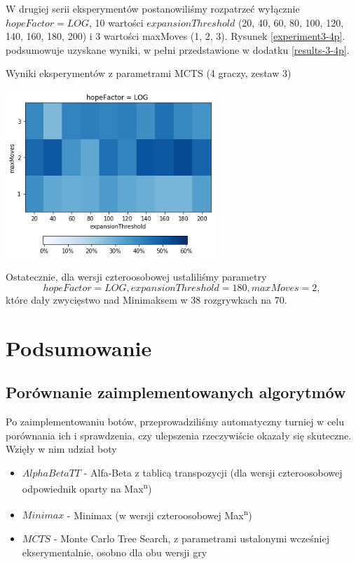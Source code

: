 \documentclass{pracamgr}
\begin{document}
W drugiej serii eksperymentów postanowiliśmy rozpatrzeć wyłącznie \(hopeFactor = LOG\), 10 wartości \(expansionThreshold\) (20, 40, 60, 80, 100, 120, 140, 160, 180, 200) i 3 wartości maxMoves (1, 2, 3).
Rysunek \ref{experiment3-4p}. podsumowuje uzyskane wyniki, w pełni przedstawione w dodatku \ref{results-3-4p}.

\begin{rysunek}
\caption{Wyniki eksperymentów z parametrami MCTS (4 graczy, zestaw 3) \label{experiment3-4p}}
\centering
\includegraphics[width=80mm]{experiment3-4p.png}
\end{rysunek}

Ostatecznie, dla wersji czteroosobowej ustaliliśmy parametry \[hopeFactor = LOG, expansionThreshold = 180, maxMoves=2,\] które dały zwycięstwo nad Minimaksem w 38 rozgrywkach na 70.

\chapter{Podsumowanie}

\section{Porównanie zaimplementowanych algorytmów}

Po zaimplementowaniu botów, przeprowadziliśmy automatyczny turniej w celu porównania ich i sprawdzenia, czy ulepszenia rzeczywiście okazały się skuteczne.
Wzięły w nim udział boty

\begin{itemize}
    \item \(AlphaBetaTT\) - Alfa-Beta z tablicą transpozycji (dla wersji czteroosobowej odpowiednik oparty na Max\textsuperscript{n})
    \item \(Minimax\) - Minimax (w wersji czteroosobowej Max\textsuperscript{n})
    \item \(MCTS\) - Monte Carlo Tree Search, z parametrami ustalonymi wcześniej ekserymentalnie, osobno dla obu wersji gry
\end{itemize}
\end{document}
